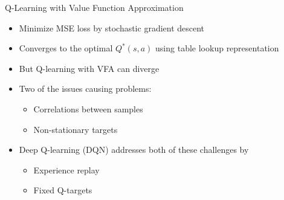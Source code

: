 \begin{frame}[c]{Q-Learning with Value Function Approximation}
	
	\begin{itemize}
		\item Minimize MSE loss by stochastic gradient descent
		\item Converges to the optimal $Q^*(s,a)$ using \alert{table lookup} representation
		\item But Q-learning with VFA can diverge
		\item Two of the issues causing problems:
		\begin{itemize}
			\item Correlations between samples
			\item Non-stationary targets
		\end{itemize}
		\item Deep Q-learning (DQN) addresses both of these challenges by
		\begin{itemize}
			\item Experience replay
			\item Fixed Q-targets
		\end{itemize}
	\end{itemize}
	
\end{frame}
